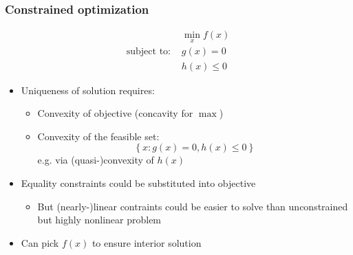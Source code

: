 \documentclass[bigger]{beamer}
\begin{document}
\begin{frame}%
\frametitle{Constrained optimization}

\begin{equation*}
\begin{array}{cc}
& \min_{x}f(x) \\ 
\text{subject to: } & g(x)=0 \\ 
& h(x)\leq 0%
\end{array}%
\end{equation*}

\begin{itemize}
\item Uniqueness of solution requires:

\begin{itemize}
\item Convexity of objective (concavity for $\max $)

\item Convexity of the feasible set:%
\begin{equation*}
\left\{ x:g(x)=0,h(x)\leq 0\right\}
\end{equation*}%
 e.g. via (quasi-)convexity of $h\left( x\right) $
\end{itemize}

\item Equality constraints could be substituted into objective

\begin{itemize}
\item But (nearly-)linear contraints could be easier to solve \newline
than unconstrained but highly nonlinear problem
\end{itemize}

\item Can pick $f\left( x\right) $ to ensure interior solution
\end{itemize}

\end{frame}
\end{document}
